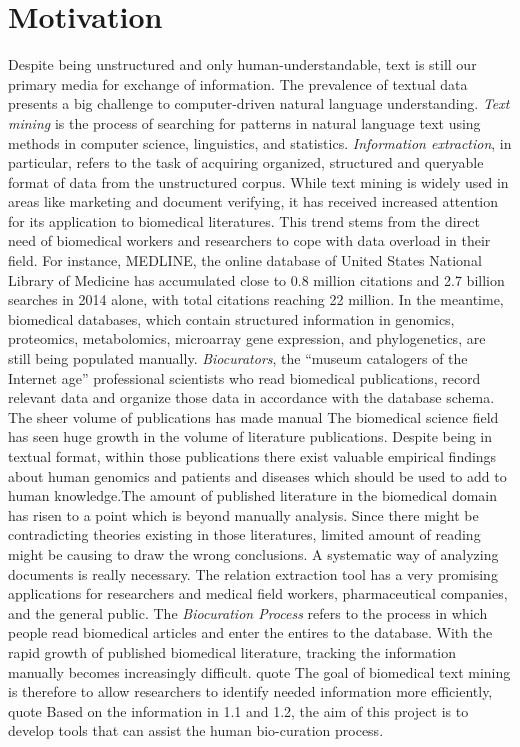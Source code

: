 \section{Motivation}\label{section1.1} %
Despite being unstructured and only human-understandable, text is still our primary media for exchange of information\cite{witten2005text}. The prevalence of textual data presents a big challenge to computer-driven natural language understanding. \emph{Text mining} is the process of searching for patterns in natural language text using methods in computer science, linguistics, and statistics. \emph{Information extraction}, in particular, refers to the task of acquiring organized, structured and queryable format of data from the unstructured corpus. \newline\newline
While text mining is widely used in areas like marketing and document verifying, it has received increased attention for its application to biomedical literatures\cite{kim2003genia,ananiadou2006text,krallinger2005text}. This trend stems from the direct need of biomedical workers and researchers to cope with data overload in their field. For instance, MEDLINE, the online database of United States National Library of Medicine has accumulated close to 0.8 million citations and 2.7 billion searches in 2014 alone\cite{MEDLINE:2015:Online}, with total citations reaching 22 million. In the meantime, biomedical databases, which contain structured information in genomics, proteomics, metabolomics, microarray gene expression, and phylogenetics\cite{altman2004editorial}, are still being populated manually. \emph{Biocurators}, the ``museum catalogers of the Internet age''\cite{wiki:biocurators} professional scientists who read biomedical publications, record relevant data and organize those data in accordance with the database schema. The sheer volume of publications has made manual The biomedical science field has seen huge growth in the volume of literature publications. Despite being in textual format, within those publications there exist valuable empirical findings about human genomics and patients and diseases which should be used to add to human knowledge.The amount of published literature in the biomedical domain has risen to a point which is beyond manually analysis. Since there might be contradicting theories existing in those literatures, 	limited amount of reading might be causing to draw the wrong conclusions. A systematic way of analyzing documents is really necessary. The relation extraction tool has a very promising applications for researchers and medical field workers, pharmaceutical companies, 	and the general public. The \emph{Biocuration Process} refers to the process in which people read biomedical articles and enter the entires to the database. With the rapid growth of published biomedical literature, tracking the information manually becomes increasingly difficult. 
quote The goal of biomedical text mining is
therefore to allow researchers to identify
needed information more efficiently, quote
Based on the information in 1.1 and 1.2, the aim of this project is to develop tools that can assist the human bio-curation process.


